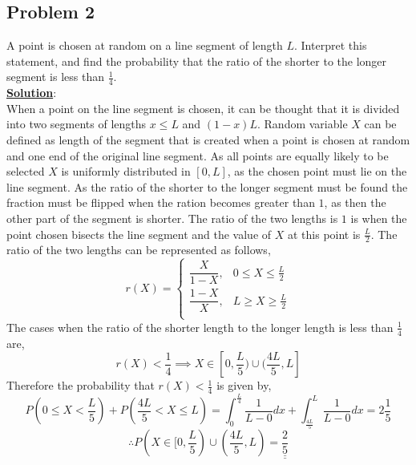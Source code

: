 \documentclass[11pt,letter paper]{report}
\begin{document}
\subsection*{Problem 2}
A point is chosen at random on a line segment of length $L$. Interpret this statement, and find the probability that the ratio of the shorter to the longer segment is less than $\frac{1}{4}$.\\[0.1cm]
{\bf \underline{Solution}}:\\
When a point on the line segment is chosen, it can be thought that it is divided into two segments of lengths $x\le L$ and $(1-x)L$. Random variable $X$ can be defined as length of the segment that is created when a point is chosen at random and one end of the original line segment. As all points are equally likely to be selected $X$ is uniformly distributed in $[0,L]$, as the chosen point must lie on the line segment. 
As the ratio of the shorter to the longer segment must be found the fraction must be flipped when the ration becomes greater than $1$, as then the other part of the segment is shorter. The ratio of the two lengths is $1$ is when the point chosen bisects the line segment and the value of $X$ at this point is $\frac{L}{2}$. 
The ratio of the two lengths can be represented as follows,
$$r(X)=\begin{cases}
\dfrac{X}{1-X},& 0\le X\le \frac{L}{2}\\
\dfrac{1-X}{X},& L\ge X\ge \frac{L}{2}\\
\end{cases}$$
The cases when the ratio of the shorter length to the longer length is less than $\frac{1}{4}$ are, 
$$r(X)<\frac{1}{4}\implies X\in [0,\frac{L}{5}) \cup (\frac{4L}{5}, L]$$
Therefore the probability that $r(X)<\frac{1}{4}$ is given by, 
$$P(0\le X<\frac{L}{5})+P(\frac{4L}{5}<X\le L)=\int_0^{\frac{L}{4}}\frac{1}{L-0}dx+\int_{\frac{4L}{5}}^L\frac{1}{L-0}dx=2\frac{1}{5}$$
$$\therefore P(X\in [0,\frac{L}{5}) \cup (\frac{4L}{5}, L)=\underline{\underline{\frac{2}{5}}}$$

\end{document}
